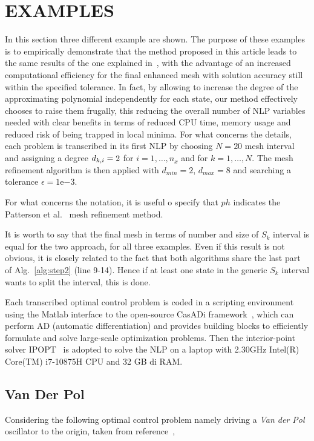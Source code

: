 \section*{EXAMPLES}
In this section three different example are shown. The purpose of these examples is to empirically demonstrate that the method proposed in this article leads to the same results of the one explained in~\cite{Patterson:OCAM:2015}, with the advantage of an increased computational efficiency for the final enhanced mesh with solution accuracy still within the specified tolerance. In fact, by allowing to increase the degree of the approximating polynomial independently for each state, our method effectively chooses to raise them frugally, this reducing the overall number of NLP variables needed with clear benefits in terms of reduced CPU time, memory usage and reduced risk of being trapped in local minima.
For what concerns the details, each problem is transcribed in its first NLP by choosing $N = 20$ mesh interval and assigning a degree $d_{k,i} = 2$ for $i = 1, \dots, n_x$ and for $k = 1, \dots, N$. The mesh refinement algorithm is then applied with $d_{min} = 2$, $d_{max} = 8$ and searching a tolerance $\epsilon = 1\mathrm{e}{-3}$.

For what concerns the notation, it is useful o specify that $ph$ indicates the Patterson et al.~\cite{Patterson:OCAM:2015} mesh refinement method.

It is worth to say that the final mesh in terms of number and size of $S_{k}$ interval is equal for the two approach, for all three examples. Even if this result is not obvious, it is closely related to the fact that both algorithms share the last part of Alg.~\ref{alg:step2} (line 9-14). Hence if at least one state in the generic $S_k$ interval wants to split the interval, this is done.

Each transcribed optimal control problem is coded in a scripting environment using the
Matlab interface to the open-source CasADi framework~\cite{casadi:MPC:2019}, which can perform AD (automatic differentiation) and provides building blocks to efficiently formulate and solve large-scale optimization problems. Then the interior-point solver IPOPT~\cite{Biegler:CCE:2009} is adopted to solve the NLP on a laptop with 2.30GHz Intel(R) Core(TM) i7-10875H CPU and 32 GB di RAM.



\subsection*{Van Der Pol}
Considering the following optimal control problem namely
driving a \emph{Van der Pol} oscillator to the origin, taken from reference~\cite{casadi:DOC:2018},

